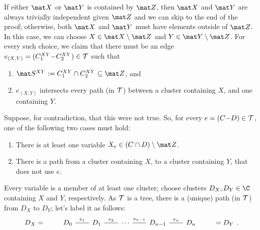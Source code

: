     
If either $\mat X$ or $\mat Y$ is contained by $\mat Z$, then $\mat X$ and $\mat Y$ are always trivially independent given $\mat Z$ and we can skip to the end of the proof; otherwise, both $\mat X$ and $\mat Y$ must have elements outside of $\mat Z$.
In this case, we can choose $X \in \mat X \setminus \mat Z$ and $Y \in \mat Y \setminus \mat Z$.    
For every such choice, we claim that there must be an edge $e_{(X,Y)}
 = (C^{XY}_1{-}C^{XY}_2)
 \in \cal T$ such that
\begin{enumerate}[nosep]
\item $\mat S^{XY} := C_1^{XY} \cap C_2^{XY} \subseteq \mat Z$, and
\item $e_{(X,Y)}$ intersects every path (in $\cal T$) between a cluster containing $X$, and one containing $Y$. 
\end{enumerate}
Suppose, for contradiction, that this were not true. 
So, for every $e = (C{-}D) \in \cal T$, one of the following two cases must hold:
\begin{enumerate}
\item There is at least one variable $X_e \in (C \cap D) \setminus \mat Z$.
\item There is a path from a cluster containing $X$, to a cluster containing $Y$, that does not use $e$. 
\end{enumerate}
%
Every variable is a member of at least one cluster; choose clusters $D_{X}, D_Y \in \C$ containing $X$ and $Y$, respectively.
As $\cal T$ is a tree, there is a (unique) path (in $\cal T$) from $D_X$ to $D_Y$; let's label it as follows:
\[
    \begin{tikzcd}[column sep=2em]
        D_X=
        &D_0 \ar[r,-,"e_1"]&
        D_1 \ar[r,-,"e_2"]&
          \cdots
        \ar[r,-,"e_{n-1}"]& D_{n-1}
        \ar[r,-,"e_n"] & D_n&
        =D_Y
    \end{tikzcd}.
\] 
